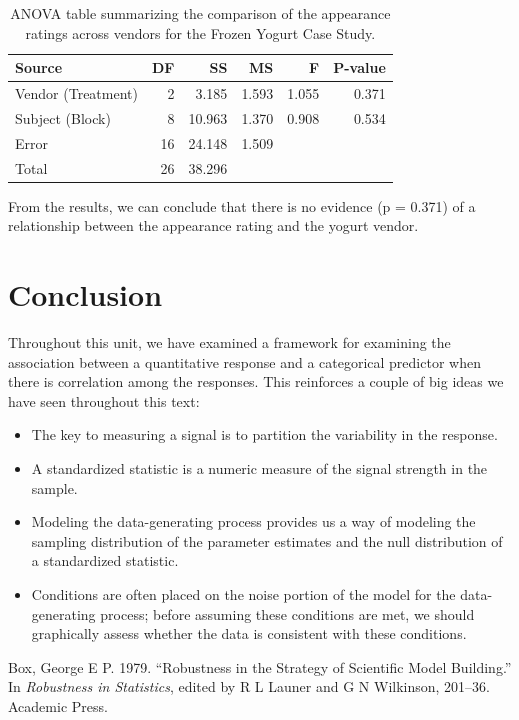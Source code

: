 \documentclass[]{book}
\providecommand{\tightlist}{%
  \setlength{\itemsep}{0pt}\setlength{\parskip}{0pt}}
\theoremstyle{plain}
\theoremstyle{mydefn}
\theoremstyle{myexmpl}
\theoremstyle{remark}
\begin{document}
\begin{table}

\caption{\label{tab:blockrecap-anova-table}ANOVA table summarizing the comparison of the appearance ratings across vendors for the Frozen Yogurt Case Study.}
\centering
\begin{tabular}[t]{l|r|r|r|r|r}
\hline
Source & DF & SS & MS & F & P-value\\
\hline
Vendor (Treatment) & 2 & 3.185 & 1.593 & 1.055 & 0.371\\
\hline
Subject (Block) & 8 & 10.963 & 1.370 & 0.908 & 0.534\\
\hline
Error & 16 & 24.148 & 1.509 &  & \\
\hline
Total & 26 & 38.296 &  &  & \\
\hline
\end{tabular}
\end{table}

From the results, we can conclude that there is no evidence (p = 0.371)
of a relationship between the appearance rating and the yogurt vendor.

\section{Conclusion}\label{conclusion-1}

Throughout this unit, we have examined a framework for examining the
association between a quantitative response and a categorical predictor
when there is correlation among the responses. This reinforces a couple
of big ideas we have seen throughout this text:

\begin{itemize}
\tightlist
\item
  The key to measuring a signal is to partition the variability in the
  response.
\item
  A standardized statistic is a numeric measure of the signal strength
  in the sample.
\item
  Modeling the data-generating process provides us a way of modeling the
  sampling distribution of the parameter estimates and the null
  distribution of a standardized statistic.
\item
  Conditions are often placed on the noise portion of the model for the
  data-generating process; before assuming these conditions are met, we
  should graphically assess whether the data is consistent with these
  conditions.
\end{itemize}

\hypertarget{refs}{}
\hypertarget{ref-Box1979}{}
Box, George E P. 1979. ``Robustness in the Strategy of Scientific Model
Building.'' In \emph{Robustness in Statistics}, edited by R L Launer and
G N Wilkinson, 201--36. Academic Press.
\end{document}
